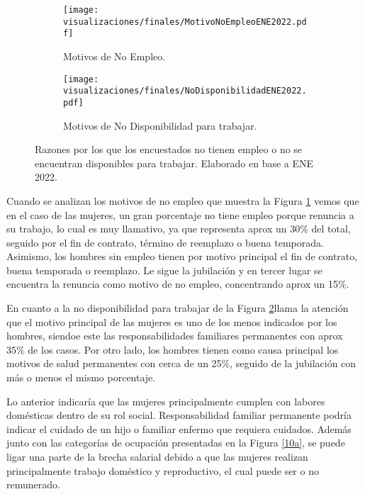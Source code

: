 \FloatBarrier

\begin{figure}[htbp]
	\centering
	\begin{subfigure}[b]{0.49\textwidth}
		\centering
		\texttt{[image: visualizaciones/finales/MotivoNoEmpleoENE2022.pdf]}
		\caption{Motivos de No Empleo.}
		\label{11a} 
	\end{subfigure}
	\hfill
	\begin{subfigure}[b]{0.49\textwidth}
		\centering
		\texttt{[image: visualizaciones/finales/NoDisponibilidadENE2022.pdf]}
		\caption{Motivos de No Disponibilidad para trabajar.}
		\label{11b}
	\end{subfigure}
	\caption{Razones por los que los encuestados no tienen empleo o no se encuentran disponibles para trabajar. Elaborado en base a ENE 2022.}
	\label{11fig}
\end{figure}

\FloatBarrier

Cuando se analizan los motivos de no empleo que muestra la Figura \ref{11a} vemos que en el caso de las mujeres, un gran porcentaje no tiene empleo porque renuncia a su trabajo, lo cual es muy llamativo, ya que representa aprox un 30\% del total, seguido por el fin de contrato, término de reemplazo o buena temporada. Asimismo, los hombres sin empleo tienen por motivo principal el fin de contrato, buena temporada o reemplazo. Le sigue la jubilación y en tercer lugar se encuentra la renuncia como motivo de no empleo, concentrando aprox un 15\%.

En cuanto a la no disponibilidad para trabajar de la Figura \ref{11b}llama la atención que el motivo principal de las mujeres es uno de los menos indicados por los hombres, siendoe este las responsabilidades familiares permanentes con aprox 35\% de los casos. Por otro lado, los hombres tienen como causa principal los motivos de salud permanentes con cerca de un 25\%, seguido de la jubilación con más o menos el mismo porcentaje.

Lo anterior indicaría que las mujeres principalmente cumplen con labores domésticas dentro de su rol social. Responsabilidad familiar permanente podría indicar el cuidado de un hijo o familiar enfermo que requiera cuidados. Además junto con las categorías de ocupación presentadas en la Figura \ref{10a}, se puede ligar una parte de la brecha salarial debido a que las mujeres realizan principalmente trabajo doméstico y reproductivo, el cual puede ser o no remunerado. 

